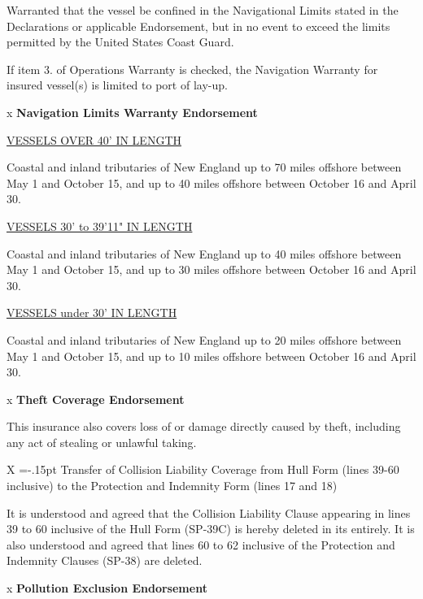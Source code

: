 \documentclass[10pt]{article}
\newcommand{\mybox}{\fboxsep=-.15pt\fbox{\rule{0pt}{2.5ex}\rule{2.5ex}{0pt}}}
\newcommand{\checkbox}[2]{%
    \ifthenelse{\equal{#1}{#2}}  
            {X}               
            {\mybox}
}
\begin{document}
Warranted that the vessel be confined in the Navigational Limits stated in the Declarations or applicable Endorsement, but in no event to exceed the limits permitted by the United States Coast Guard.

If item 3. of Operations Warranty is checked, the Navigation Warranty for insured vessel(s) is limited to port of lay-up.

\vspace{\baselineskip}
x \hspace{0.25in} \textbf{Navigation Limits Warranty Endorsement}

\underline{VESSELS OVER 40' IN LENGTH}

Coastal and inland tributaries of New England up to 70 miles offshore between May 1 and October 15, and up to 40 miles offshore between October 16 and April 30.

\underline{VESSELS 30' to 39'11" IN LENGTH}

Coastal and inland tributaries of New England up to 40 miles offshore between May 1 and October 15, and up to 30 miles offshore between October 16 and April 30.

\underline{VESSELS under 30' IN LENGTH}

Coastal and inland tributaries of New England up to 20 miles offshore between May 1 and October 15, and up to 10 miles offshore between October 16 and April 30.

\vspace{\baselineskip}
x \hspace{0.25in} \textbf{Theft Coverage Endorsement}

This insurance also covers loss of or damage directly caused by theft, including any act of stealing or unlawful taking.

\vspace{\baselineskip}
\checkbox{1} TTransfer of Collision Liability Coverage from Hull Form (lines 39-60 inclusive) to the Protection and Indemnity Form (lines 17 and 18)

It is understood and agreed that the Collision Liability Clause appearing in lines 39 to 60 inclusive of the Hull Form (SP-39C) is hereby deleted in its entirely. It is also understood and agreed that lines 60 to 62 inclusive of the Protection and Indemnity Clauses (SP-38) are deleted.

\vspace{\baselineskip}
x \hspace{0.25in} \textbf{Pollution Exclusion Endorsement}
\end{document}
